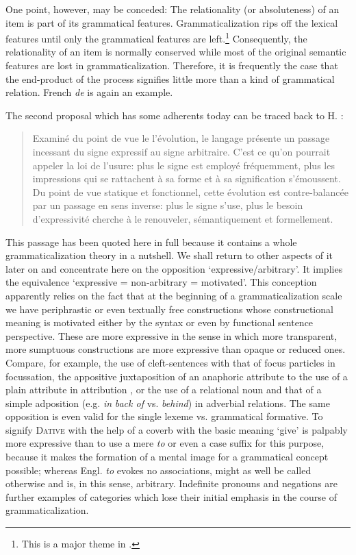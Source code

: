 One point, however, may be conceded: The relationality (or absoluteness) of an item is part of its grammatical features. Grammaticalization rips off the lexical features until only the grammatical features are left.\footnote{This is a major theme in \citealt{Givón1973}.} Consequently, the relationality of an item is normally conserved while most of the original semantic features are lost in grammaticalization. Therefore, it is frequently the case that the end-product of the process signifies little more than a kind of grammatical relation. French \textit{de} is again an example.

The second proposal which has some adherents today can be traced back to H. \citet[233]{Frei1929}:

\begin{quote}
Examiné du point de vue le l'évolution, le langage présente un passage incessant du signe expressif au signe arbitraire. C'est ce qu'on pourrait appeler la loi de l'usure: plus le signe est employé fréquemment, plus les impressions qui se rattachent à sa forme et à sa signification s'émoussent. Du point de vue statique et fonctionnel, cette évolution est contre-balancée par un passage en sens inverse: plus le signe s'use, plus le besoin d'expressivité cherche à le renouveler, sémantiquement et formellement.
\end{quote}

\noindent This passage has been quoted here in full because it contains a whole grammaticalization theory in a nutshell. We shall return to other aspects of it later on and concentrate here on the opposition ‘expressive/arbitrary’. It implies the equivalence ‘expressive = non-arbitrary = motivated’. This conception apparently relies on the fact that at the beginning of a grammaticalization scale we have periphrastic or even textually free constructions whose constructional meaning is motivated either by the syntax or even by functional sentence perspective. These are more expressive in the sense in which more transparent, more sumptuous constructions are more expressive than opaque or reduced ones. Compare, for example, the use of cleft-sentences with that of focus particles in focussation, the appositive juxtaposition of an anaphoric attribute to the use of a plain attribute in attribution%
, or the use of a relational noun and that of a simple adposition (e.g. \textit{in} \textit{back of} vs. \textit{behind}) in adverbial relations. The same opposition is even valid for the single lexeme vs. grammatical formative. To signify \textsc{Dative} with the help of a coverb with the basic meaning ‘give’ is palpably more expressive than to use a mere \textit{to} or even a case suffix for this purpose, because it makes the formation of a mental image for a grammatical concept possible; whereas Engl. \textit{to} evokes no associations, might as well be called otherwise and is, in this sense, arbitrary. Indefinite pronouns and negations are further examples of categories which lose their initial emphasis in the course of grammaticalization.

